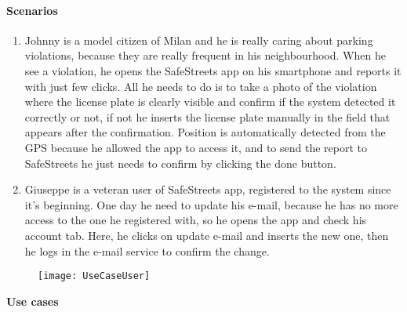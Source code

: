 \paragraph{Scenarios}
    \begin{enumerate}
        \item Johnny is a model citizen of Milan and he is really caring about parking violations, because they are really frequent in his neighbourhood. When he see a violation, he opens the SafeStreets app on his smartphone and reports it with just few clicks. All he needs to do is to take a photo of the violation where the license plate is clearly visible and confirm if the system detected it correctly or not, if not he inserts the license plate manually in the field that appears after the confirmation. Position is automatically detected from the GPS because he allowed the app to access it, and to send the report to SafeStreets he just needs to confirm by clicking the done button.
        
        \item Giuseppe is a veteran user of SafeStreets app, registered to the system since it's beginning. One day he need to update his e-mail, because he has no more access to the one he registered with, so he opens the app and check his account tab. Here, he clicks on update e-mail and inserts the new one, then he logs in the e-mail service to confirm the change.
    \end{enumerate}

\begin{figure}[H]
	\centering
    \texttt{[image: UseCaseUser]}
\end{figure}	

\textbf{Use cases}\\

